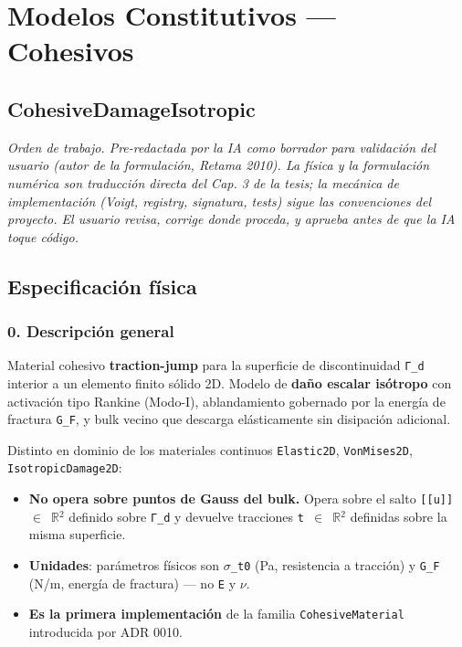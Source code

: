 \documentclass[11pt,letterpaper,oneside]{report}
\begin{document}
\newpage

\chapter{Modelos Constitutivos — Cohesivos}

\section{CohesiveDamageIsotropic}



\textit{Orden de trabajo. Pre-redactada por la IA como borrador para validación del usuario (autor de la formulación, Retama 2010). La física y la formulación numérica son traducción directa del Cap. 3 de la tesis; la mecánica de implementación (Voigt, registry, signatura, tests) sigue las convenciones del proyecto. El usuario revisa, corrige donde proceda, y aprueba antes de que la IA toque código.}



\section{Especificación física}

\subsection{0. Descripción general}

Material cohesivo \textbf{traction-jump} para la superficie de discontinuidad \texttt{Γ\_d} interior a un elemento finito sólido 2D. Modelo de \textbf{daño escalar isótropo} con activación tipo Rankine (Modo-I), ablandamiento gobernado por la energía de fractura \texttt{G\_F}, y bulk vecino que descarga elásticamente sin disipación adicional.

Distinto en dominio de los materiales continuos \texttt{Elastic2D}, \texttt{VonMises2D}, \texttt{IsotropicDamage2D}:

\begin{itemize}
  \item \textbf{No opera sobre puntos de Gauss del bulk.} Opera sobre el salto \texttt{[[u]] \ensuremath{\in} \ensuremath{\mathbb{R}}\ensuremath{^{2}}} definido sobre \texttt{Γ\_d} y devuelve tracciones \texttt{t \ensuremath{\in} \ensuremath{\mathbb{R}}\ensuremath{^{2}}} definidas sobre la misma superficie.
  \item \textbf{Unidades}: parámetros físicos son \texttt{\ensuremath{\sigma}\_t0} (Pa, resistencia a tracción) y \texttt{G\_F} (N/m, energía de fractura) --- no \texttt{E} y \texttt{\ensuremath{\nu}}.
  \item \textbf{Es la primera implementación} de la familia \texttt{CohesiveMaterial} introducida por ADR 0010.
\end{itemize}
\end{document}
